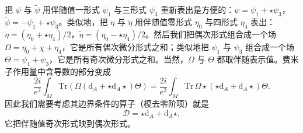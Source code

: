 \documentclass[11pt,a4paper,UTF8]{ctexart}
\theoremstyle{plain}
\theoremstyle{definition}
\begin{document}

把 $\psi$ 与 $\tilde\psi$ 用伴随值一形式 $\psi_1$ 与三形式 $\psi_3$ 重新表出是方便的：$\psi=\psi_1+\star\psi_3$，$\tilde\psi=-\psi_1+\star\psi_3$。类似地，把 $\eta$ 与 $\tilde\eta$ 用伴随值零形式 $\eta_0$ 与四形式 $\eta_4$ 表出：$\eta=(\eta_0+\star\eta_4)/2$，$\tilde\eta=(\eta_0-\star\eta_4)/2$。然后我们把偶次形式组合成一个场 $\Omega=\eta_0+\chi+\eta_4$，它是所有偶次微分形式之和；类似地把 $\psi_1$ 与 $\psi_3$ 组合成一个场 $\Theta=\psi_1+\psi_3$，它是所有奇次微分形式之和。当然，$\Omega$ 与 $\Theta$ 都取伴随表示值。费米子作用量中含导数的部分变成
\begin{equation}
    \frac{2i}{e^2}\int_M \mathrm{Tr}\left(\Omega(\mathrm{d}_A+\star\mathrm{d}_A\star)\Theta\right)=\frac{2i}{e^2}\int_M \mathrm{Tr}\,\Omega\star(\star\mathrm{d}_A+\mathrm{d}_A\star)\Theta .
    \tag{A.2}
\end{equation}
因此我们需要考虑其边界条件的算子（模去零阶项）就是
\begin{equation}
    \mathcal{D}=\star\mathrm{d}_A+\mathrm{d}_A\star ,
    \tag{A.3}
\end{equation}
它把伴随值奇次形式映到偶次形式。

\end{document}
